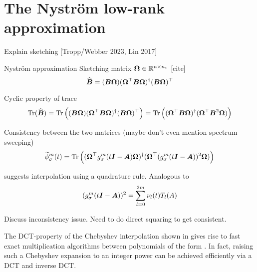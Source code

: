 
\section{The Nystr\"om low-rank approximation}
\label{sec:3-nystrom-nystrom}

Explain sketching [Tropp/Webber 2023, Lin 2017]

Nyström approximation \cite{gittens2013nystrom}
Sketching matrix $\boldsymbol{\Omega} \in \mathbb{R}^{n \times n_v}$ [cite]
\begin{equation}
    \widehat{\boldsymbol{B}} = (\boldsymbol{B} \boldsymbol{\Omega}) (\boldsymbol{\Omega}^{\top} \boldsymbol{B} \boldsymbol{\Omega})^{\dagger} (\boldsymbol{B} \boldsymbol{\Omega})^{\top}
    \label{equ:3-nystrom-SS-nystrom}
\end{equation}

Cyclic property of trace
\begin{equation}
    \operatorname{Tr}(\widehat{\boldsymbol{B}})
        = \operatorname{Tr}\left((\boldsymbol{B} \boldsymbol{\Omega}) (\boldsymbol{\Omega}^{\top} \boldsymbol{B} \boldsymbol{\Omega})^{\dagger} (\boldsymbol{B} \boldsymbol{\Omega})^{\top} \right)
        = \operatorname{Tr}\left((\boldsymbol{\Omega}^{\top} \boldsymbol{B} \boldsymbol{\Omega})^{\dagger} (\boldsymbol{\Omega}^{\top} \boldsymbol{B}^2 \boldsymbol{\Omega}) \right)
    \label{equ:3-nystrom-nystrom-trace}
\end{equation}

Consistency between the two matrices (maybe don't even mention spectrum sweeping)
\begin{equation}
    \widetilde{\phi}_{\sigma}^m(t)
        = \operatorname{Tr}\left((\boldsymbol{\Omega}^{\top} g_{\sigma}^m(t\boldsymbol{I} - \boldsymbol{A}) \boldsymbol{\Omega})^{\dagger} (\boldsymbol{\Omega}^{\top} (g_{\sigma}^m(t\boldsymbol{I} - \boldsymbol{A}))^2 \boldsymbol{\Omega})\right)
    \label{equ:3-nystrom-spectral-density}
\end{equation}

\cite{lin2017randomized} suggests interpolation using a quadrature rule.
Analogous to 
\begin{equation}
    (g_{\sigma}^m(t\boldsymbol{I} - \boldsymbol{A}))^2 = \sum_{l=0}^{2m} \nu_l(t) T_l(A)
    \label{equ:3-nystrom-ESS-chebyshev-expansion}
\end{equation}

Discuss inconsistency issue. Need to do direct squaring to get consistent.

The \gls{DCT}-property of the Chebyshev interpolation shown in 
gives rise to fast exact multiplication algorithms between polynomials
of the form  \cite[Proposition~3.1]{baszenski1997cosine}.
In fact, raising such a Chebyshev expansion to an integer power can be achieved
efficiently via a \gls{DCT} and inverse \gls{DCT}.

